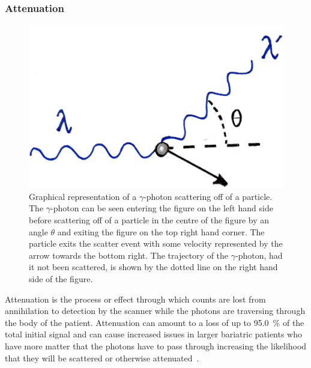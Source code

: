             \subsubsection{Attenuation} \label{sec:attenuation}
                \begin{figure}
                    \centering
                    
                    \includegraphics[width=1.0\linewidth]{figures/background_scatter.png}
                    
                    \captionsetup{singlelinecheck=false, justification=raggedright}
                    \caption{Graphical representation of a $\gamma$-photon scattering off of a particle. The $\gamma$-photon can be seen entering the figure on the left hand side before scattering off of a particle in the centre of the figure by an angle $\theta$ and exiting the figure on the top right hand corner. The particle exits the scatter event with some velocity represented by the arrow towards the bottom right. The trajectory of the $\gamma$-photon, had it not been scattered, is shown by the dotted line on the right hand side of the figure.} \label{fig:attenuation_scatter}
                \end{figure}
                
                Attenuation is the process or effect through which counts are lost from annihilation to detection by the scanner while the photons are traversing through the body of the patient. Attenuation can amount to a loss of up to \SI{95.0}{\percent} of the total initial signal and can cause increased issues in larger bariatric patients who have more matter that the photons have to pass through increasing the likelihood that they will be scattered or otherwise attenuated~. %
                
